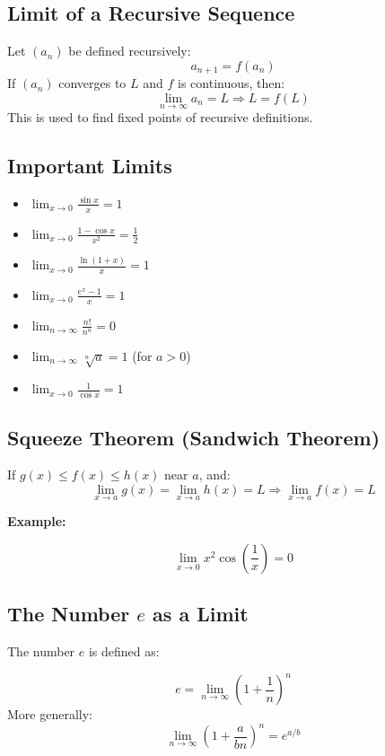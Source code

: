 \subsection{Limit of a Recursive Sequence}

Let \((a_n)\) be defined recursively:
\[
a_{n+1} = f(a_n)
\]
If \((a_n)\) converges to \(L\) and \(f\) is continuous, then:
\[
\lim_{n \to \infty} a_n = L \Rightarrow L = f(L)
\]
This is used to find fixed points of recursive definitions.

\subsection{Important Limits}

\begin{itemize}[label=\(-\)]
\item \(\displaystyle \lim_{x \to 0} \frac{\sin x}{x} = 1\)
\item \(\displaystyle \lim_{x \to 0} \frac{1 - \cos x}{x^2} = \frac{1}{2}\)
\item \(\displaystyle \lim_{x \to 0} \frac{\ln(1 + x)}{x} = 1\)
\item \(\displaystyle \lim_{x \to 0} \frac{e^x - 1}{x} = 1\)
\item \(\displaystyle \lim_{n \to \infty} \frac{n!}{n^n} = 0\)
\item \(\displaystyle \lim_{n \to \infty} \sqrt[n]{a} = 1\) (for \(a > 0\))
\item \(\displaystyle \lim_{x \to 0} \frac{1}{\cos x} = 1\)
\end{itemize}

\subsection{Squeeze Theorem (Sandwich Theorem)}

If \(g(x) \le f(x) \le h(x)\) near \(a\), and:
\[
\lim_{x \to a} g(x) = \lim_{x \to a} h(x) = L
\Rightarrow \lim_{x \to a} f(x) = L
\]

\textbf{Example:}

\[
\lim_{x \to 0} x^2 \cos\left( \frac{1}{x} \right) = 0
\]

\subsection{The Number \texorpdfstring{\(e\)}{e} as a Limit}

The number \(e\) is defined as:

\[
e = \lim_{n \to \infty} {\left(1 + \frac{1}{n} \right)}^n
\]
More generally:
\[
\lim_{n \to \infty} {\left(1 + \frac{a}{bn} \right)}^n = e^{a/b}
\]

